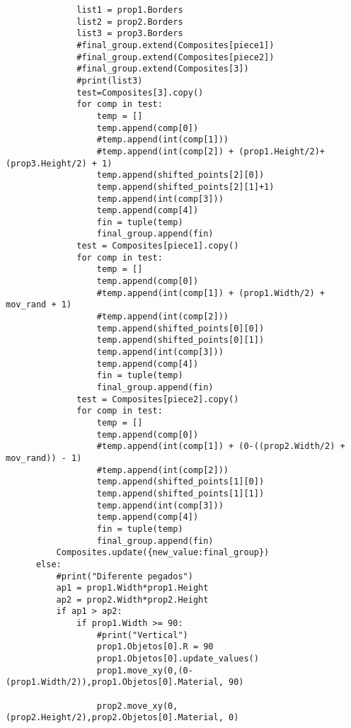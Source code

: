 \begin{verbatim}
              list1 = prop1.Borders
              list2 = prop2.Borders
              list3 = prop3.Borders
              #final_group.extend(Composites[piece1])
              #final_group.extend(Composites[piece2])
              #final_group.extend(Composites[3])
              #print(list3)
              test=Composites[3].copy()
              for comp in test:
                  temp = []
                  temp.append(comp[0])
                  #temp.append(int(comp[1]))
                  #temp.append(int(comp[2]) + (prop1.Height/2)+(prop3.Height/2) + 1)
                  temp.append(shifted_points[2][0])
                  temp.append(shifted_points[2][1]+1)
                  temp.append(int(comp[3]))
                  temp.append(comp[4])
                  fin = tuple(temp)
                  final_group.append(fin)
              test = Composites[piece1].copy()
              for comp in test:
                  temp = []
                  temp.append(comp[0])
                  #temp.append(int(comp[1]) + (prop1.Width/2) + mov_rand + 1)
                  #temp.append(int(comp[2]))
                  temp.append(shifted_points[0][0])
                  temp.append(shifted_points[0][1])
                  temp.append(int(comp[3]))
                  temp.append(comp[4])
                  fin = tuple(temp)
                  final_group.append(fin)
              test = Composites[piece2].copy()
              for comp in test:
                  temp = []
                  temp.append(comp[0])
                  #temp.append(int(comp[1]) + (0-((prop2.Width/2) + mov_rand)) - 1)
                  #temp.append(int(comp[2]))
                  temp.append(shifted_points[1][0])
                  temp.append(shifted_points[1][1])
                  temp.append(int(comp[3]))
                  temp.append(comp[4])
                  fin = tuple(temp)
                  final_group.append(fin)
          Composites.update({new_value:final_group})
      else:
          #print("Diferente pegados")
          ap1 = prop1.Width*prop1.Height
          ap2 = prop2.Width*prop2.Height
          if ap1 > ap2:
              if prop1.Width >= 90:
                  #print("Vertical")
                  prop1.Objetos[0].R = 90
                  prop1.Objetos[0].update_values()
                  prop1.move_xy(0,(0-(prop1.Width/2)),prop1.Objetos[0].Material, 90)

                  prop2.move_xy(0,(prop2.Height/2),prop2.Objetos[0].Material, 0)


\end{verbatim}
